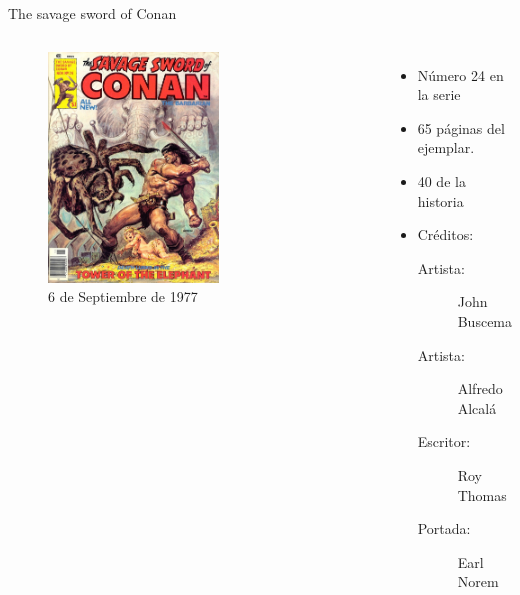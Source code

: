 \begin{frame}{The savage sword of Conan}
\begin{columns}
    \begin{figure}[htb]
    \centering
        \includegraphics[width=0.6\textwidth]{img/TSSC24Portada}
        \caption{6 de Septiembre de 1977}
    \end{figure}    
    \begin{itemize}
         \item Número 24 en la serie
         \item 65 páginas del ejemplar.
         \item 40 de la historia
         \item Créditos:
         \begin{description}
            \item[Artista:] John Buscema
            \item[Artista:] Alfredo Alcalá
            \item[Escritor:] Roy Thomas
            \item[Portada:] Earl Norem
         \end{description}
    \end{itemize}
\end{columns}
\end{frame}

